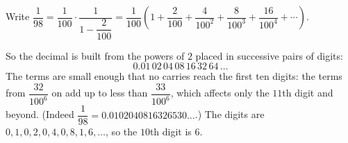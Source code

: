 Write $\dfrac{1}{98}=\dfrac{1}{100}\cdot\dfrac{1}{1-\dfrac{2}{100}}=\dfrac{1}{100}\left(1+\dfrac{2}{100}+\dfrac{4}{100^2}+\dfrac{8}{100^3}+\dfrac{16}{100^4}+\cdots\right)$.

So the decimal is built from the powers of $2$ placed in successive pairs of digits:
\[0.01\,02\,04\,08\,16\,32\,64\,\ldots\]
The terms are small enough that no carries reach the first ten digits: the terms from $\dfrac{32}{100^6}$ on add up to less than $\dfrac{33}{100^6}$, which affects only the $11$th digit and beyond. (Indeed $\dfrac{1}{98}=0.0102040816326530\ldots$.) The digits are $0,1,0,2,0,4,0,8,1,6,\ldots$, so the $10$th digit is $\boxed{6}$.
